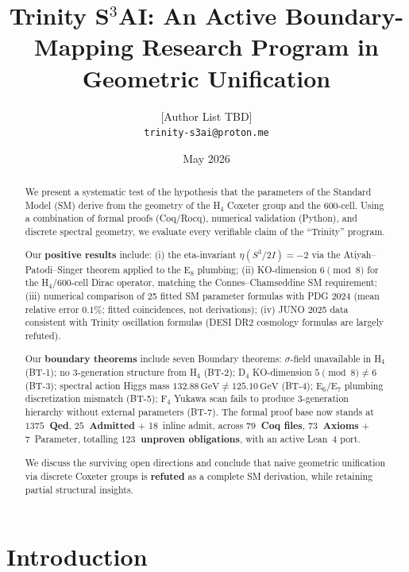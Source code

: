 \documentclass[11pt,a4paper]{article}
\title{Trinity S$^3$AI: An Active Boundary-Mapping Research Program in Geometric Unification}
\author{[Author List TBD]\\
  \texttt{trinity-s3ai@proton.me}}
\date{May 2026}
\theoremstyle{definition}
\begin{document}
\maketitle

\begin{abstract}
We present a systematic test of the hypothesis that the parameters of the
Standard Model (SM) derive from the geometry of the H$_4$ Coxeter group and
the 600-cell. Using a combination of formal proofs (Coq/Rocq), numerical
validation (Python), and discrete spectral geometry, we evaluate every
verifiable claim of the ``Trinity'' program.

Our \textbf{positive results} include: (i) the eta-invariant
$\eta(S^3/2I) = -2$ via the Atiyah--Patodi--Singer theorem applied to the
E$_8$ plumbing; (ii) KO-dimension $6 \pmod 8$ for the H$_4$/600-cell Dirac
operator, matching the Connes--Chamseddine SM requirement; (iii) numerical
comparison of 25 fitted SM parameter formulas with PDG 2024 (mean relative
error $0.1\%$; fitted coincidences, not derivations); (iv) JUNO 2025 data consistent with Trinity
oscillation formulas (DESI DR2 cosmology formulas are largely refuted).

Our \textbf{boundary theorems} include seven Boundary theorems:
$\sigma$-field unavailable in H$_4$ (BT-1); no 3-generation structure from
H$_4$ (BT-2); D$_4$ KO-dimension $5 \pmod 8 \neq 6$ (BT-3); spectral
action Higgs mass $132.88\,\text{GeV} \neq 125.10\,\text{GeV}$ (BT-4);
E$_6$/E$_7$ plumbing discretization mismatch (BT-5); F$_4$ Yukawa scan
fails to produce 3-generation hierarchy without external parameters (BT-7).
The formal proof base now stands at \textbf{$1375$~Qed}, \textbf{$25$~Admitted} + 18~inline admit,
across \textbf{$79$~Coq files}, \textbf{$73$~Axioms} + 7~Parameter, totalling \textbf{$123$~unproven obligations},
with an active Lean~4 port.

We discuss the surviving open directions and conclude that naive geometric
unification via discrete Coxeter groups is \textbf{refuted} as a complete SM
derivation, while retaining partial structural insights.
\end{abstract}

\section{Introduction}\label{sec:intro}
\end{document}
